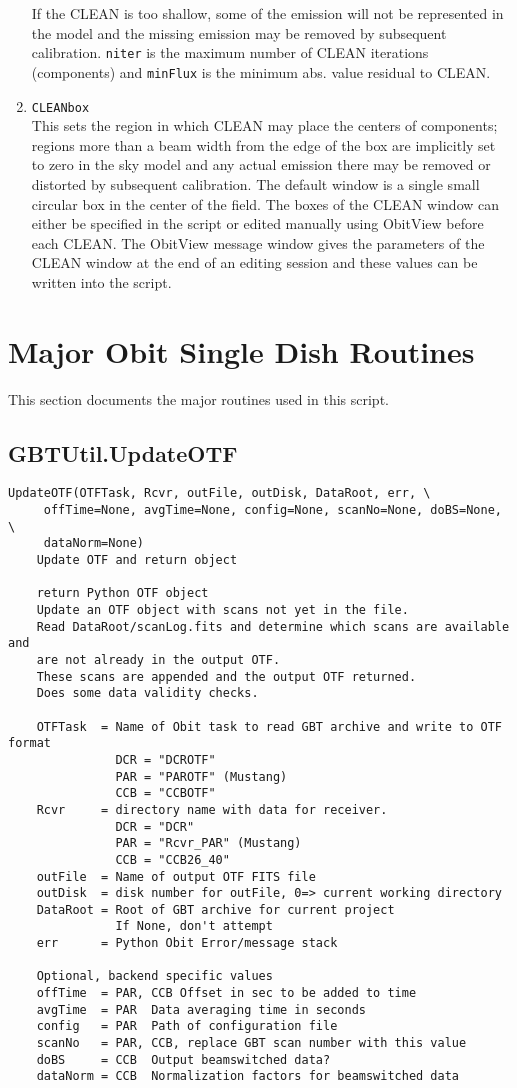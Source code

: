 \documentclass[11pt]{report}
\begin{document}
\begin{enumerate}
If the CLEAN is too shallow, some of the emission will not be
represented in the model and the missing emission may be removed by
subsequent calibration.
{\tt niter} is the maximum number of CLEAN iterations (components) and
{\tt minFlux} is the minimum abs. value residual to CLEAN.
\item {\tt CLEANbox} \\
This sets the region in which CLEAN may place the centers of
components; regions more than a beam width from the edge of the box
are implicitly set to zero in the sky model and any actual emission
there may be removed or distorted by subsequent calibration.
The default window is a single small circular box in the center of the
field.
The boxes of the CLEAN window can either be specified in the script
or edited manually using ObitView before each CLEAN.
The ObitView message window gives the parameters of the CLEAN window
at the end of an editing session and these values can be written into
the script.
\end{enumerate}

\section{Major Obit Single Dish  Routines}
This section documents the major routines used in this script.

\subsection{GBTUtil.UpdateOTF}
\begin{verbatim}
UpdateOTF(OTFTask, Rcvr, outFile, outDisk, DataRoot, err, \
     offTime=None, avgTime=None, config=None, scanNo=None, doBS=None, \
     dataNorm=None)
    Update OTF and return object
    
    return Python OTF object
    Update an OTF object with scans not yet in the file.
    Read DataRoot/scanLog.fits and determine which scans are available and
    are not already in the output OTF.
    These scans are appended and the output OTF returned.
    Does some data validity checks.
    
    OTFTask  = Name of Obit task to read GBT archive and write to OTF format
               DCR = "DCROTF"
               PAR = "PAROTF" (Mustang)
               CCB = "CCBOTF"
    Rcvr     = directory name with data for receiver.
               DCR = "DCR"
               PAR = "Rcvr_PAR" (Mustang)
               CCB = "CCB26_40"
    outFile  = Name of output OTF FITS file
    outDisk  = disk number for outFile, 0=> current working directory
    DataRoot = Root of GBT archive for current project
               If None, don't attempt
    err      = Python Obit Error/message stack
    
    Optional, backend specific values
    offTime  = PAR, CCB Offset in sec to be added to time
    avgTime  = PAR  Data averaging time in seconds
    config   = PAR  Path of configuration file
    scanNo   = PAR, CCB, replace GBT scan number with this value
    doBS     = CCB  Output beamswitched data?
    dataNorm = CCB  Normalization factors for beamswitched data
\end{verbatim}
\end{document}
